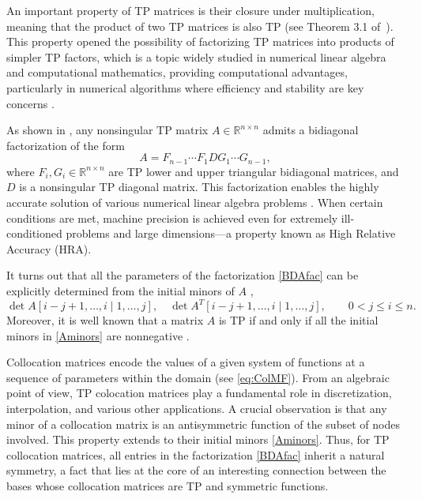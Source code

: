\documentclass[smallextended]{svjour3}       %
\begin{document}
 
An important property of TP matrices is their closure under multiplication, meaning that the product of two TP matrices is also TP (see Theorem 3.1 of~\cite{Ando}).  This property opened the possibility of factorizing TP matrices into products of simpler TP factors, which is a topic widely studied in numerical linear algebra and computational mathematics, providing computational advantages, particularly in numerical algorithms where efficiency and stability are key concerns  \cite{Marco3,dop1,dop2,Koev1,Koev2,Koev4,Demmel1,Demmel2}.   

   
   
As shown in \cite{Gasca2,Gasca3}, any nonsingular  TP matrix \( A \in \mathbb{R}^{n \times n} \) admits a bidiagonal factorization of the form  
\begin{equation}\label{BDAfac}
    A = F_{n-1} \cdots F_1 D G_1 \cdots G_{n-1},
\end{equation}  
where \( F_i, G_i \in \mathbb{R}^{n \times n} \) are TP lower and upper triangular bidiagonal matrices, and \( D \) is a nonsingular TP diagonal matrix.  
This factorization enables the highly accurate solution of various numerical linear algebra problems \cite{Martinez2024}.   When certain conditions are met, machine precision is achieved even for extremely ill-conditioned problems and large dimensions—a property known as High Relative Accuracy (HRA).

It turns out that all the parameters of the factorization \eqref{BDAfac} can be explicitly determined from the initial minors of $A$ \cite{Gasca1,Gasca2}, 
\begin{equation}\label{Aminors}
    \det A[i-j+1, \dots, i \mid 1, \dots, j], \quad  
    \det A^T[i-j+1, \dots, i \mid 1, \dots, j], \quad  
     \quad 0 < j \leq i \leq n.
\end{equation}  
 Moreover, it is well known that a matrix \( A \) is TP if and only if all the initial minors in \eqref{Aminors} are nonnegative \cite{Gasca1,Gasca3}. 
  


 Collocation matrices encode the values of a given system of functions at a sequence of parameters within the domain (see \eqref{eq:ColMF}). 
From an algebraic point of view, TP colocation matrices play a fundamental role in discretization, interpolation, and various other applications. 
A crucial observation is that any minor of a collocation matrix is an antisymmetric function of the subset of nodes involved. 
 This property extends to their initial minors \eqref{Aminors}. Thus, for TP collocation matrices, all entries in the factorization \eqref{BDAfac}  inherit a natural symmetry, a fact that lies at the core of an interesting connection between the bases whose collocation matrices are TP and symmetric functions.
\end{document}
